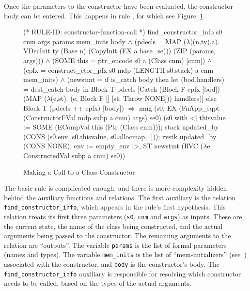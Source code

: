 \documentclass[11pt]{article}
\begin{document}
Once the parameters to the constructor have been evaluated, the
constructor body can be entered.%
%
This happens in rule , for which see
Figure~\ref{fig:constructor-function-call}.
\begin{figure}[htbp]
\begin{stdrule}
(* RULE-ID: constructor-function-call *)
     find_constructor_info s0 cnm args params mem_inits body \(\land\)
     (pdecls = MAP (\(\lambda\)((n,ty),a).
                        VDecInit ty (Base n)
                                    (CopyInit (EX a base_se)))
                   (ZIP (params, args))) \(\land\)
     (SOME this = ptr_encode s0 a (Class cnm) [cnm]) \(\land\)
     (cpfx = construct_ctor_pfx s0 mdp (LENGTH s0.stack) a
                                cnm mem_inits) \(\land\)
     (newstmt =
        if is_catch body then
          let (bod,handlers) = dest_catch body
          in
            Block T pdecls
              [Catch (Block F cpfx [bod])
                     (MAP (\(\lambda\)(e,st).
                             (e, Block F [] [st; Throw NONE]))
                          handlers)]
        else Block T (pdecls ++ cpfx) [body])
   \(\Rightarrow\)
     mng (s0, EX (FnApp_sqpt (ConstructorFVal mdp subp a cnm)
                             args) se0)
         (s0 with <|
           thisvalue := SOME (ECompVal this (Ptr (Class cnm)));
           stack updated_by
                 (CONS (s0.env, s0.thisvalue, s0.allocmap, []));
           rvstk updated_by (CONS NONE);
           env := empty_env
          |>,
          ST newstmt (RVC (\(\lambda\)e. ConstructedVal subp a cnm)
                          se0))
\end{stdrule}
\caption{Making a Call to a Class Constructor}
\label{fig:constructor-function-call}
\end{figure}
The basic rule is complicated enough, and there is more complexity
hidden behind the auxiliary functions and relations.  The first
auxiliary is the relation \texttt{find_constructor_info}, which
appears in the rule's first hypothesis.  This relation treats its
first three parameters (\texttt{s0}, \texttt{cnm} and \texttt{args})
as inputs.  These are the current state, the name of the class being
constructed, and the actual arguments being passed to the constructor.
The remaining arguments to the relation are ``outputs''.  The variable
\texttt{params} is the list of formal parameters (names and types).
The variable \texttt{mem_inits} is the list of ``mem-initializers''
(see~\cite[\S12.6.2]{cpp-standard-iso14882}) associated with the
constructor, and \texttt{body} is the constructor's body.  The
\texttt{find_constructor_info} auxiliary is responsible for resolving
which constructor needs to be called, based on the types of the actual
arguments.
\end{document}
